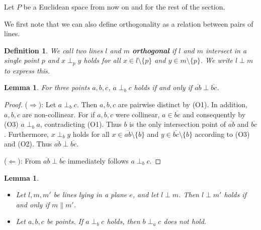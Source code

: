 \documentclass[11pt,a4paper]{article}
\newcommand{\ortho}[3]{#1 \perp_{#2} #3}
\newcommand{\lineab}[1]{\overline{#1}}
\newtheorem{lemma}[theorem]{Lemma}
\newtheorem{definition}[theorem]{Definition}
\begin{document}
Let $P$ be a Euclidean space from now on and for the rest of the section.

We first note that we can also define orthogonality as a relation between pairs of lines.

\begin{definition} \label{def:line_orthogonality}
We call two lines $l$ and $m$ \textbf{orthogonal} if $l$ and $m$ intersect in a single point $p$ and $\ortho{x}{p}{y}$ holds for all $x \in l \setminus \{p\}$ and $y \in m \setminus \{p\}$. We write $l \perp m$ to express this.
\end{definition}

\begin{lemma} \label{lem:point_line_ortho_equiv}
For three points $a, b, c$, $\ortho{a}{b}{c}$ holds if and only if $\lineab{ab} \perp \lineab{bc}$.
\end{lemma}

\begin{proof}
($\Rightarrow$): Let $\ortho{a}{b}{c}$. Then $a, b, c$ are pairwise distinct by (O1). In addition, $a, b, c$ are non-collinear. For if $a, b, c$ were collinear, $a \in \lineab{bc}$ and consequently by (O3) $\ortho{a}{b}{a}$, contradicting (O1). Thus $b$ is the only intersection point of $\lineab{ab}$ and $\lineab{bc}$. Furthermore, $\ortho{x}{b}{y}$ holds for all $x \in \lineab{ab} \setminus \{b\}$ and $y \in \lineab{bc} \setminus \{b\}$ according to (O3) and (O2). Thus $\lineab{ab} \perp \lineab{bc}$.

($\Leftarrow$): From $\lineab{ab} \perp \lineab{bc}$ immediately follows $\ortho{a}{b}{c}$.
\end{proof}

\begin{lemma} \label{lem:plane_orthogonality}
\begin{itemize}
    \item[(i)] Let $l, m, m'$ be lines lying in a plane $e$, and let $l \perp m$. Then $l \perp m'$ holds if and only if $m \parallel m'$.
    \item[(ii)] Let $a, b, c$ be points. If $\ortho{a}{b}{c}$ holds, then $\ortho{b}{a}{c}$ does not hold.
\end{itemize}
\end{lemma}
\end{document}
